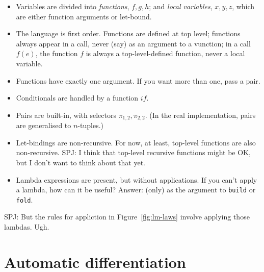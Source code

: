 \documentclass[sigplan,review]{acmart}
\newcommand{\sel}[2]{\pi_{#1,#2}}
\newcommand{\iffun}{\mathit{if}}
\newcommand{\simon}[1]{{\color{red}SPJ: #1}}
\begin{document}
\begin{itemize}
\item  Variables are divided into \emph{functions}, $f,g,h$; and \emph{local variables}, $x,y,z$,
  which are either function arguments or let-bound.
\item 
  The language is first order.  Functions are defined at top level; functions always appear in a call, never (say) as an argument to a vunction; in a call $f(e)$, the function $f$ is always a top-level-defined function, never a local variable.

\item Functions have exactly one argument. If you want more than one, pass a pair.

  \item Conditionals are handled by a function $\iffun$.

\item Pairs are built-in, with selectors $\sel{1}{2}, \sel{2}{2}$.
  (In the real implementation, pairs are generalised to $n$-tuples.)

\item Let-bindings are non-recursive. For now, at least, top-level
  functions are also non-recursive.  \simon{I think that top-level
    recursive functions might be OK, but I don't want to think about
    that yet.}

\item Lambda expressions are present, but without applications.
  If you can't apply a lambda, how can it be useful?  Answer: (only) as the
  argument to \lstinline|build| or \lstinline|fold|.
  \end{itemize}
\simon{But the rules for appliction in Figure~\ref{fig:lm-laws} involve applying those lambdas.  Ugh.}

\section{Automatic differentiation}
\end{document}
